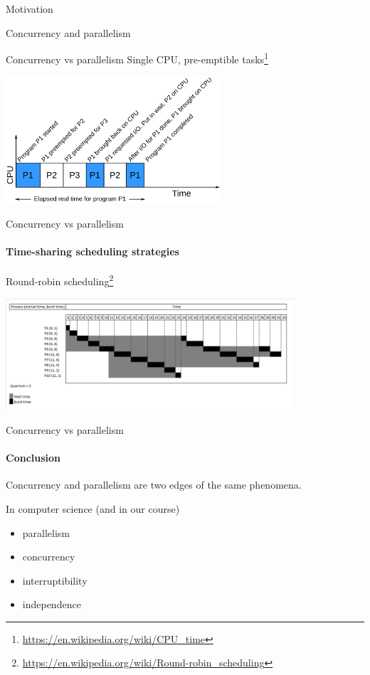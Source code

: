 \begin{section}{Motivation}
\begin{section}{Concurrency and parallelism}
\begin{frame}{Concurrency vs parallelism}
Single CPU, pre-emptible tasks\footnote{\tiny\url{https://en.wikipedia.org/wiki/CPU_time}}

\begin{center}
\includegraphics[width=0.6\textwidth]{./pics/time_sharing_two.png}
\end{center}

\end{frame}

\begin{frame}{Concurrency vs parallelism}
\framesubtitle{Time-sharing scheduling strategies}

Round-robin scheduling\footnote{\tiny\url{https://en.wikipedia.org/wiki/Round-robin_scheduling}}

\begin{center}
\includegraphics[width=0.8\textwidth]{./pics/round_robin.png}
\end{center}


\end{frame}


\begin{frame}{Concurrency vs parallelism}
\framesubtitle{Conclusion}

Concurrency and parallelism are two edges of the same phenomena.

In computer science (and in our course) 
\begin{itemize}
    \item parallelism
    \item concurrency
    \item interruptibility
    \item independence
\end{itemize}


\end{frame}
\end{section}
\end{section}
